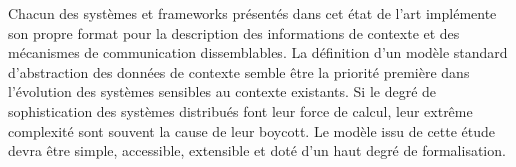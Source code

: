 Chacun des systèmes et frameworks présentés dans cet état de l'art implémente
son propre format pour la description des informations de contexte et des
mécanismes de communication dissemblables. La définition d'un modèle standard
d'abstraction des données de contexte semble être la priorité première dans
l'évolution des systèmes sensibles au contexte existants. Si le degré de
sophistication des systèmes distribués font leur force de calcul, leur
extrême complexité sont souvent la cause de leur boycott. Le modèle issu de
cette étude devra être simple, accessible, extensible et doté d'un haut degré de
formalisation.

